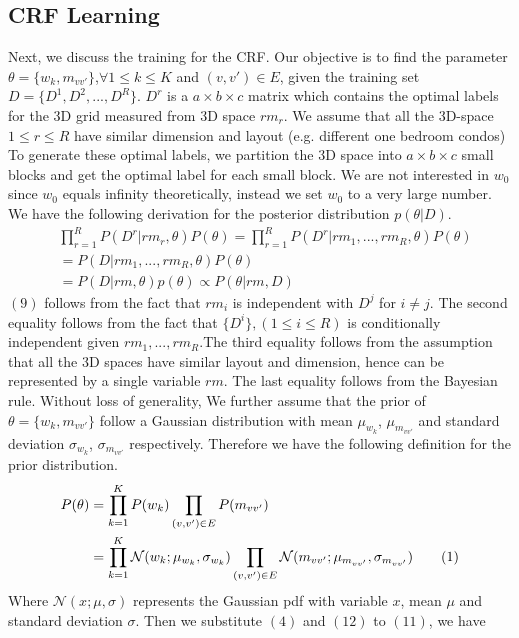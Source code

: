 \documentclass[conference]{IEEEtran}
\newcommand\numberthis{\addtocounter{equation}{1}\tag{\theequation}}
\begin{document}
\subsection{CRF Learning}
Next, we discuss the training for the CRF. Our objective is to find the parameter $\theta=\{w_{k},m_{vv'}\}$,$\forall 1\leq k\leq K$ and $(v,v')\in E$, given the training set $D=\{D^{1},D^{2},...,D^{R}\}$. $D^{r}$ is a $a\times b\times c$ matrix which contains the optimal labels for the 3D grid measured from 3D space $rm_{r}$. We assume that all the 3D-space $1\leq r\leq R$ have similar dimension and layout (e.g. different one bedroom condos) To generate these optimal labels, we partition the 3D space into $a\times b\times c$ small blocks and get the optimal label for each small block. We are not interested in $w_{0}$ since $w_0$ equals infinity theoretically, instead we set $w_{0}$ to a very large number. We have the following derivation for the posterior distribution $p(\theta|D)$.
\begin{align}
&\prod_{r=1}^{R} P(D^{r}|rm_{r},\theta) P(\theta)= \prod_{r=1}^{R} P(D^{r}|rm_{1},...,rm_{R},\theta)P(\theta) \\
 &=P(D|rm_{1},...,rm_{R},\theta) P(\theta)\\
&= P(D|rm,\theta)p(\theta) \propto P(\theta|rm,D)
\end{align}
$(9)$ follows from the fact that $rm_{i}$ is independent with $D^{j}$ for $i\neq j$. The second equality follows from the fact that $\{D^{i}\},(1\leq i\leq R) $ is conditionally independent given $rm_{1},...,rm_{R}$.The third equality follows from the assumption that all the 3D spaces have similar layout and dimension, hence can be represented by a single variable $rm$. The last equality follows from the Bayesian rule. Without loss of generality, We further assume that the prior of $\theta=\{w_k, m_{vv'}\}$ follow a Gaussian distribution with mean $\mu_{w_{k}}$, $\mu_{m_{vv'}}$ and standard deviation $\sigma_{w_{k}}$, $\sigma_{m_{vv'}}$ respectively. Therefore we have the following definition for the prior distribution. 
\begin{align*}
    P(\theta) &= \prod_{k=1}^{K} P(w_{k}) \prod_{(v,v')\in E} P(m_{vv'})\\ &= \prod_{k=1}^{K} \mathcal{N}(w_{k};\mu_{w_{k}},\sigma_{w_{k}})\prod_{(v,v')\in E}\mathcal{N}({m}_{vv'};\mu_{m_{vv'}},\sigma_{m_{vv'}})\numberthis 
\end{align*}
Where $\mathcal{N}(x;\mu,\sigma)$ represents the Gaussian pdf with variable $x$, mean $\mu$ and standard deviation $\sigma$. Then we substitute $(4)$ and $(12)$ to $(11)$, we have 
\end{document}
